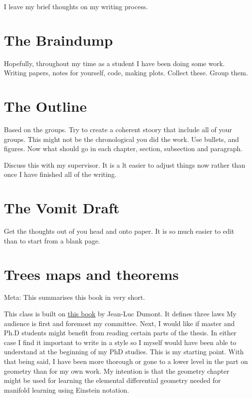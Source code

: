 I leave my brief thoughts on my writing process.


\section{The Braindump}
Hopefully, throughout my time as a student I have been doing some work. Writing papers, notes for yourself, code, making plots. Collect these. Group them.

\section{The Outline}
Based on the groups. Try to create a coherent stoory that include all of your groups. This might not be the chronological you did the work. Use bullets, and figures. Now what should go in each chapter, section, subsection and paragraph.

Discuss this with my supervisor. It is a lt easier to adjust things now rather than once I have finished all of the writing.

\section{The Vomit Draft}
Get the thoughts out of you head and onto paper. It is so much easier to edit than to start from a blank page. 

\section{Trees maps and theorems} \label{sec:trees}
Meta: This summarises this book in very short.

This class is built on \href{https://www.principiae.be/book/}{this book} by Jean-Luc Dumont. It defines three laws
My audience is first and foremost my committee. Next, I would like if master and Ph.D students might benefit from reading certain parts of the thesis. In either case I find it important to write in a style so I myself would have been able to understand at the beginning of my PhD studies. This is my starting point. With that being said, I have been more thorough or gone to a lower level in the part on geometry than for my own work. My intention is that the geometry chapter might be used for learning the elemental differential geometry needed for manifold learning using Einstein notation.


